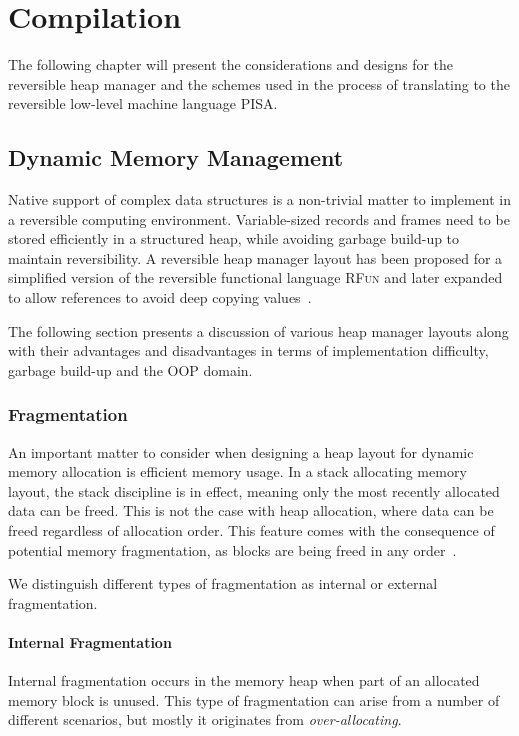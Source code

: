 \chapter{Compilation}
\label{chp:compilation}
The following chapter will present the considerations and designs for the reversible heap manager and the schemes used in the process of translating \rooplpp to the reversible low-level machine language \textsc{PISA}.

\section{Dynamic Memory Management}
\label{sec:dynamic-memory-management}
Native support of complex data structures is a non-trivial matter to implement in a reversible computing environment. Variable-sized records and frames need to be stored efficiently in a structured heap, while avoiding garbage build-up to maintain reversibility. A reversible heap manager layout has been proposed for a simplified version of the reversible functional language \textsc{RFun} and later expanded to allow references to avoid deep copying values~\cite{ha:heap, ty:rfun, tm:refcounting}.

The following section presents a discussion of various heap manager layouts along with their advantages and disadvantages in terms of implementation difficulty, garbage build-up and the OOP domain. 

\subsection{Fragmentation}
\label{subsec-fragmentation}
An important matter to consider when designing a heap layout for dynamic memory allocation is efficient memory usage. In a stack allocating memory layout, the stack discipline is in effect, meaning only the most recently allocated data can be freed. This is not the case with heap allocation, where data can be freed regardless of allocation order. This feature comes with the consequence of potential memory fragmentation, as blocks are being freed in any order~\cite{tm:languages}.

We distinguish different types of fragmentation as internal or external fragmentation.

\subsubsection{Internal Fragmentation}
Internal fragmentation occurs in the memory heap when part of an allocated memory block is unused. This type of fragmentation can arise from a number of different scenarios, but mostly it originates from \textit{over-allocating}. 

